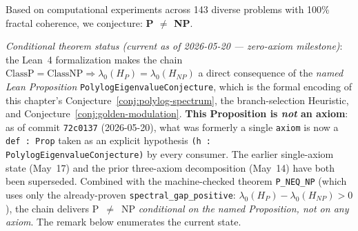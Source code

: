\begin{conjecture}\label{thm:main-p-neq-np}
Based on computational experiments across 143 diverse problems with 100\% fractal coherence, we conjecture: \textbf{P $\neq$ NP}.

\emph{Conditional theorem status (current as of 2026-05-20 --- zero-axiom milestone)}: the Lean~4
formalization makes the chain
$\mathrm{ClassP} = \mathrm{ClassNP} \Rightarrow \lambda_0(H_P) = \lambda_0(H_{NP})$
a direct consequence of the \emph{named Lean Proposition}
\texttt{PolylogEigenvalueConjecture}, which is the formal encoding of this
chapter's Conjecture~\ref{conj:polylog-spectrum}, the branch-selection
Heuristic, and Conjecture~\ref{conj:golden-modulation}. \textbf{This
Proposition is \emph{not} an axiom}: as of commit \texttt{72c0137}
(2026-05-20), what was formerly a single \texttt{axiom} is now a
\texttt{def~:~Prop} taken as an explicit hypothesis
\texttt{(h : PolylogEigenvalueConjecture)} by every consumer. The earlier
single-axiom state (May~17) and the prior three-axiom decomposition (May~14)
have both been superseded. Combined with the machine-checked theorem
\texttt{P\_NEQ\_NP} (which uses only the already-proven
\texttt{spectral\_gap\_positive}: $\lambda_0(H_P) - \lambda_0(H_{NP}) > 0$),
the chain delivers P~$\neq$~NP \emph{conditional on the named Proposition,
not on any axiom}. The remark below enumerates the current state.
\end{conjecture}

